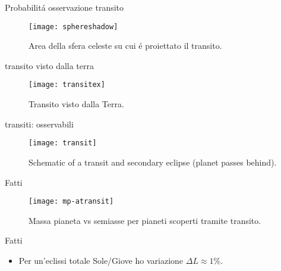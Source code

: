 \begin{wordonframe}{Probabilit\'a osservazione transito}
\begin{figure}[!ht]
\centering
\texttt{[image: sphereshadow]}
\caption{Area della sfera celeste su cui \'e proiettato il transito.}
\end{figure}
\end{wordonframe}

\begin{wordonframe}{transito visto dalla terra}
\begin{figure}[!ht]
\centering
\texttt{[image: transitex]}
\caption{Transito visto dalla Terra.}
\end{figure}
\end{wordonframe}

\begin{wordonframe}{transiti: osservabili}
\begin{figure}[!ht]
\centering
\texttt{[image: transit]}
\caption{Schematic of a transit and secondary eclipse (planet passes behind).}
\end{figure}
\end{wordonframe}

\begin{frame}{Fatti}
\begin{figure}[!ht]
\centering
\texttt{[image: mp-atransit]}
\caption{Massa pianeta vs semiasse per pianeti scoperti tramite transito.}
\end{figure}
\end{frame}

\begin{wordonframe}{Fatti}
\begin{itemize}
    \item Per un'eclissi totale Sole/Giove ho variazione $\Delta L\approx1\%$.
\end{itemize}
\end{wordonframe}